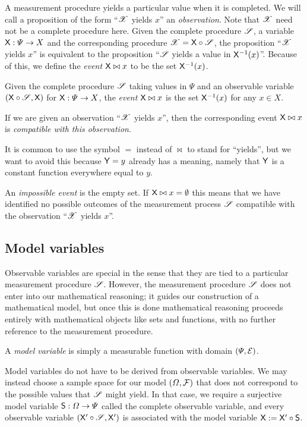 A measurement procedure yields a particular value when it is completed. We will call a proposition of the form ``$\mathscr{X}$ yields $x$'' an \emph{observation}. Note that $\mathscr{X}$ need not be a complete procedure here. Given the complete procedure $\mathscr{S}$, a variable $\mathsf{X}:\Psi\to X$ and the corresponding procedure $\mathscr{X}=\mathsf{X}\circ\mathscr{S}$, the proposition ``$\mathscr{X}$ yields $x$'' is equivalent to the proposition ``$\mathscr{S}$ yields a value in $\mathsf{X}^{-1}(x)$''. Because of this, we define the \emph{event} $\mathsf{X}\bowtie x$ to be the set $\mathsf{X}^{-1}(x)$.

\begin{definition}[Event]
Given the complete procedure $\mathscr{S}$ taking values in $\Psi$ and an observable variable $(\mathsf{X}\circ \mathscr{S},\mathsf{X})$ for $\mathsf{X}:\Psi\to X$, the \emph{event} $\mathsf{X}\bowtie x$ is the set $\mathsf{X}^{-1}(x)$ for any $x\in X$.
\end{definition}

If we are given an observation ``$\mathscr{X}$ yields $x$'', then the corresponding event $\mathsf{X}\bowtie x$ is \emph{compatible with this observation}.

It is common to use the symbol $=$ instead of $\bowtie$ to stand for ``yields'', but we want to avoid this because $\mathsf{Y}=y$ already has a meaning, namely that $\mathsf{Y}$ is a constant function everywhere equal to $y$.

An \emph{impossible event} is the empty set. If $\mathsf{X}\bowtie x=\emptyset$ this means that we have identified no possible outcomes of the measurement process $\mathscr{S}$ compatible with the observation ``$\mathscr{X}$ yields $x$''. 

\subsection{Model variables}

Observable variables are special in the sense that they are tied to a particular measurement procedure $\mathscr{S}$. However, the measurement procedure $\mathscr{S}$ does not enter into our mathematical reasoning; it guides our construction of a mathematical model, but once this is done mathematical reasoning proceeds entirely with mathematical objects like sets and functions, with no further reference to the measurement procedure.

A \emph{model variable} is simply a measurable function with domain $(\Psi,\mathcal{E})$.

Model variables do not have to be derived from observable variables. We may instead choose a sample space for our model $(\Omega,\mathcal{F})$ that does not correspond to the possible values that $\mathscr{S}$ might yield. In that case, we require a surjective model variable $\mathsf{S}:\Omega\to \Psi$ called the complete observable variable, and every observable variable $(\mathsf{X}'\circ \mathscr{S},\mathsf{X}')$ is associated with the model variable $\mathsf{X}:=\mathsf{X}'\circ \mathsf{S}$.


